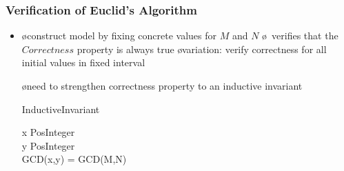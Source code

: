 \begin{frame}
  \frametitle{Verification of Euclid's Algorithm}

  \begin{itemize}
  \item {}

    \begin{itemize}
    \o construct model by fixing concrete values for $M$ and $N$
    \o \tlc\ verifies that the $Correctness$ property is always true
    \o variation: verify correctness for all initial values in fixed interval
    \end{itemize}

\pause

  \oo {}

    \begin{itemize}
    \o need to strengthen correctness property to an \alert{inductive invariant}

       \medskip
       \begin{tlablock}[.7]
         InductiveInvariant\ \deq\ 
         \begin{conj}
           x \in PosInteger\\
           y \in PosInteger\\
           GCD(x,y) = GCD(M,N)
         \end{conj}
       \end{tlablock}
    \end{itemize}
  \end{itemize}
\end{frame}

